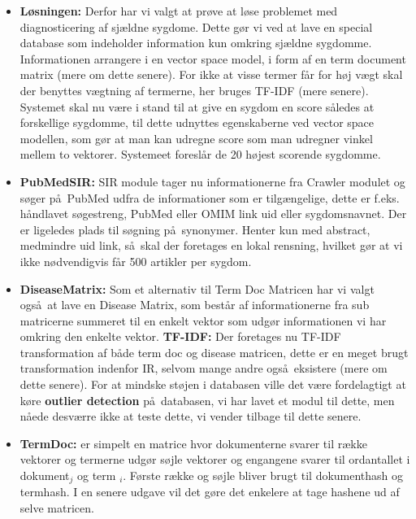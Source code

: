 \documentclass[a4paper, 10pt, english, final]{report}
\begin{document}

\begin{itemize}

  \item \textbf{L\o sningen:} Derfor har vi valgt at pr\o ve at l\o se problemet med diagnosticering af sj\ae ldne sygdome. Dette g\o r vi ved at lave en special database som indeholder information kun omkring sj\ae ldne sygdomme. Informationen arrangere i en vector space model, i form af en term document matrix (mere om dette senere). For ikke at visse termer f\aa r for h\o j v\ae gt skal der benyttes v\ae gtning af termerne, her bruges TF-IDF (mere senere). Systemet skal nu v\ae re i stand til at give en sygdom en score s\aa ledes at forskellige sygdomme, til dette udnyttes egenskaberne ved vector space modellen, som g\o r at man kan udregne score som man udregner vinkel mellem to vektorer. Systemeet foresl\aa r de 20 h\o jest scorende sygdomme.

    \item \textbf{PubMedSIR:} SIR module tager nu informationerne fra Crawler modulet og s\o ger p\aa\ PubMed udfra de informationer som er tilg\ae ngelige, dette er f.eks. h\aa ndlavet s\o gestreng, PubMed eller OMIM link uid eller sygdomsnavnet. Der er ligeledes plads til s\o gning p\aa\ synonymer. Henter kun med abstract, medmindre uid link, s\aa\ skal der foretages en lokal rensning, hvilket g\o r at vi ikke n\o dvendigvis f\aa r 500 artikler per sygdom.

    \item \textbf{DiseaseMatrix:} Som et alternativ til Term Doc Matricen har vi valgt ogs\aa\ at lave en Disease Matrix, som best\aa r af informationerne fra sub matricerne summeret til en enkelt vektor som udg\o r informationen vi har omkring den enkelte vektor. \textbf{TF-IDF:} Der foretages nu TF-IDF transformation af b\aa de term doc og disease matricen, dette er en meget brugt transformation indenfor IR, selvom mange andre ogs\aa\ eksistere (mere om dette senere). For at mindske st\o jen i databasen ville det v\ae re fordelagtigt at k\o re \textbf{outlier detection} p\aa\ databasen, vi har lavet et modul til dette, men n\aa ede desv\ae rre ikke at teste dette, vi vender tilbage til dette senere.

    \item \textbf{TermDoc:} er simpelt en matrice hvor dokumenterne svarer til r\ae kke vektorer og termerne udg\o r s\o jle vektorer og engangene svarer til ordantallet i dokument$_j$ og term $_i$. F\o rste r\ae kke og s\o jle bliver brugt til dokumenthash og termhash. I en senere udgave vil det g\o re det enkelere at tage hashene ud af selve matricen.


\end{itemize}
\end{document}
